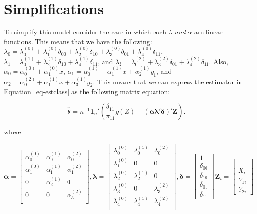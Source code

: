 \documentclass[
  letterpaper,
  DIV=11,
  numbers=noendperiod]{scrartcl}
\newcommand{\bf}{\mathbf}
\begin{document}
\hypertarget{simplifications}{%
\section{Simplifications}\label{simplifications}}

To simplify this model consider the case in which each \(\lambda\)
\emph{and} \(\alpha\) are linear functions. This means that we have the
following:
\(\lambda_0 = \lambda_0^{(0)} + \lambda_1^{(0)}\delta_{00} + \lambda_2^{(0)} \delta_{10} + \lambda_3^{(0)} \delta_{01} + \lambda_4^{(0)}\delta_{11}\),
\(\lambda_1 = \lambda_0^{(1)} + \lambda_2^{(1)} \delta_{10} + \lambda_4^{(1)}\delta_{11}\),
and
\(\lambda_2 = \lambda_0^{(2)} + \lambda_3^{(2)} \delta_{01} + \lambda_4^{(2)}\delta_{11}\).
Also, \(\alpha_0 = \alpha_0^{(0)} + \alpha_1^{(0)} x\),
\(\alpha_1 = \alpha_0^{(1)} + \alpha_1^{(1)} x + \alpha_2^{(1)} y_1\),
and
\(\alpha_2 = \alpha_0^{(2)} + \alpha_1^{(1)} x + \alpha_3^{(1)} y_2\).
This means that we can express the estimator in
Equation~\ref{eq-estclass} as the following matrix equation:

\[
\hat \theta = n^{-1} \bf{1}_n' \left(\frac{\delta_{11}}{\pi_{11}} g(Z) + 
(\pmb{\alpha} \pmb{\lambda}' \pmb{\delta})' \bf Z\right).
\]

where

\[
\pmb{\alpha} = 
\begin{bmatrix}
\alpha_0^{(0)} & \alpha_0^{(1)} & \alpha_0^{(2)} \\
\alpha_1^{(0)} & \alpha_1^{(1)} & \alpha_1^{(2)} \\
0 & \alpha_2^{(1)} & 0 \\
0 & 0 & \alpha_3^{(2)} \\
\end{bmatrix},
\pmb{\lambda} = 
\begin{bmatrix}
\lambda_0^{(0)} & \lambda_0^{(1)} & \lambda_0^{(2)} \\
\lambda_1^{(0)} & 0 & 0 \\
\lambda_2^{(0)} & \lambda_2^{(1)} & 0 \\
\lambda_3^{(0)} & 0 & \lambda_3^{(2)} \\
\lambda_4^{(0)} & \lambda_4^{(1)} & \lambda_4^{(2)} \\
\end{bmatrix},
\pmb{\delta}= 
\begin{bmatrix}
1 \\ \delta_{00} \\ \delta_{10} \\ \delta_{01} \\ \delta_{11}
\end{bmatrix}
\bf{Z}_i = 
\begin{bmatrix}
1 \\ X_i \\ Y_{1i} \\ Y_{2i}
\end{bmatrix}
\]
\end{document}
